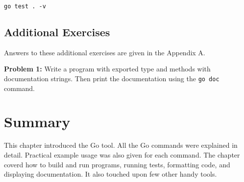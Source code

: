 \begin{lstlisting}[numbers=none]
go test . -v
\end{lstlisting}

\subsection{Additional Exercises}

Answers to these additional exercises are given in the Appendix A.

{\bfseries Problem 1:} Write a program with exported type and methods
with documentation strings.  Then print the documentation
using the \texttt{go doc} command.

\section*{Summary}

This chapter introduced the Go tool.  All the Go commands were
explained in detail.  Practical example usage was also given for each
command.  The chapter coverd how to build and run programs, running
tests, formatting code, and displaying documentation.  It also touched
upon few other handy tools.
